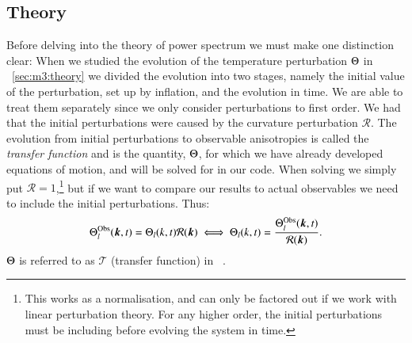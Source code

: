 \subsection{Theory}\label{sec:m4:theory}
    Before delving into the theory of power spectrum we must make one distinction clear: When we studied the evolution of the temperature perturbation $\Theta$ in ~\cref{sec:m3:theory} we divided the evolution into two stages, namely the initial value of the perturbation, set up by inflation, and the evolution in time. We are able to treat them separately since we only consider perturbations to first order. We had that the initial perturbations were caused by the curvature perturbation $\mathcal{R}$. The evolution from initial perturbations to observable anisotropies is called the \textit{transfer function} and is the quantity, $\Theta$, for which we have already developed equations of motion, and will be solved for in our code. When solving we simply put $\mathcal{R}=1$,\footnote{This works as a normalisation, and can only be factored out if we work with linear perturbation theory. For any higher order, the initial perturbations must be including before evolving the system in time.} but if we want to compare our results to actual observables we need to include the initial perturbations. Thus:
    \begin{equation}
        \Theta^\mathrm{Obs}_l(\boldsymbol{k},t) = \Theta_l(k,t)\mathcal{R}(\boldsymbol{k}) \iff \Theta_l(k,t)=\frac{\Theta^\mathrm{Obs}_l(\boldsymbol{k},t)}{\mathcal{R}(\boldsymbol{k})}.
    \end{equation}
    $\Theta$ is referred to as $\mathcal{T}$ (transfer function) in ~\cite{dodelson2020modern}.
